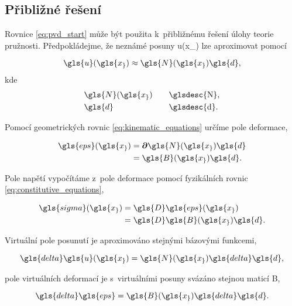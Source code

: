 \subsection{Přibližné řešení} \label{sec:approximate_solution}

Rovnice \ref{eq:pvd_start} může být použita k~přibližnému řešení úlohy teorie pružnosti. Předpokládejme, že neznámé posuny \gls{u}(\gls{x_}) lze aproximovat pomocí

\begin{equation} \label{eq:approx_first}
    \gls{u}(\gls{x_}) \approx \gls{N}(\gls{x_})\gls{d},
\end{equation}
kde
\begin{alignat*}{2}
    & \gls{N}(\gls{x_})     && \quad \text{\glsdesc{N},} \\
    & \gls{d}               && \quad \text{\glsdesc{d}.}
\end{alignat*}

Pomocí geometrických rovnic \ref{eq:kinematic_equations} určíme pole deformace,

\begin{equation}
    \begin{split}
        \gls{eps}(\gls{x_}) &= \boldsymbol\partial\gls{N}(\gls{x_}){\gls{d}} \\
                            &= \gls{B}(\gls{x_}){\gls{d}}.
    \end{split}
\end{equation}

Pole napětí vypočítáme z~pole deformace pomocí fyzikálních rovnic \ref{eq:constitutive_equations},

\begin{equation}
    \begin{split}
        \gls{sigma}(\gls{x_}) &= \gls{D} \gls{eps}(\gls{x_}) \\
                             &= \gls{D} \gls{B}(\gls{x_}){\gls{d}}.
    \end{split}
\end{equation}

Virtuální pole posunutí je aproximováno stejnými bázovými funkcemi,

\begin{equation}
    \gls{delta}\gls{u}(\gls{x_}) = \gls{N}(\gls{x_})\gls{delta}\gls{d},
\end{equation}

pole virtuálních deformací je s~virtuálními posuny svázáno stejnou maticí \gls{B},

\begin{equation} \label{eq:approx_last}
    \gls{delta}\gls{eps} = \gls{B}(\gls{x_})\gls{delta}\gls{d}.
\end{equation}

